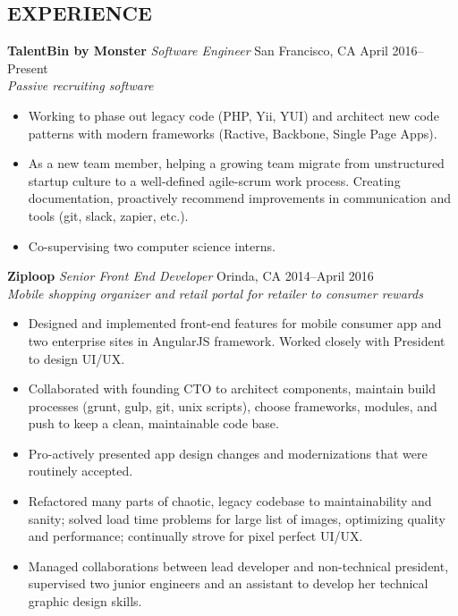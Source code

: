 \documentclass[11pt]{res} %
\begin{document}
\begin{resume}
\section{ EXPERIENCE} 
\vspace{4pt}
\textbf{TalentBin by Monster}  \hspace{6pt}  \textit {Software Engineer}  \hfill San Francisco, CA April 2016--Present \\
\textit {Passive recruiting software}
\vspace{2pt}
\begin{itemize} \itemsep -1pt 
  \item Working to phase out legacy code (PHP, Yii, YUI) and architect new code patterns with modern frameworks (Ractive, Backbone, Single Page Apps).
  \item As a new team member, helping a growing team migrate from unstructured startup culture to a well-defined agile-scrum work process. Creating documentation, proactively recommend improvements in communication and tools (git, slack, zapier, etc.).
  \item Co-supervising two computer science interns.
\end{itemize}
%
\vspace{-6pt}
\textbf{Ziploop}  \hspace{6pt}  \textit {Senior Front End Developer}                \hfill Orinda, CA 2014--April 2016 \\
\textit {Mobile shopping organizer and retail portal for retailer to consumer rewards}
\vspace{2pt}
\begin{itemize} \itemsep -1pt 
  \item Designed and implemented front-end features for mobile consumer app and two enterprise sites in AngularJS framework.  Worked closely with President to design UI/UX.
  \item Collaborated with founding CTO to architect components, maintain build processes (grunt, gulp, git, unix scripts), choose frameworks, modules, and push to keep a clean, maintainable code base.
  \item Pro-actively presented app design changes and modernizations that were routinely accepted.  
  \item Refactored many parts of chaotic, legacy codebase to maintainability and sanity; solved load time problems for large list of images, optimizing quality and performance; continually strove for pixel perfect UI/UX.
  \item Managed collaborations between lead developer and non-technical president, supervised two junior engineers and an assistant to develop her technical graphic design skills.

\end{itemize}
\end{resume}
\end{document}
